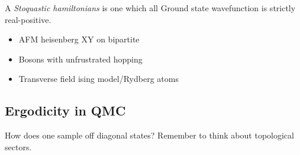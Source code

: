 \documentclass[a4paper]{article}
\begin{document}
A \emph{Stoquastic hamiltonians} is one which all 
Ground state wavefunction is strictly real-positive. 
\begin{itemize} 
    \item AFM heisenberg XY on bipartite
    \item Bosons with unfrustrated hopping
    \item Transverse field ising model/Rydberg atoms
\end{itemize}
\subsection{Ergodicity in QMC}
How does one sample off diagonal  states?
Remember to think about topological sectors.
\end{document}

